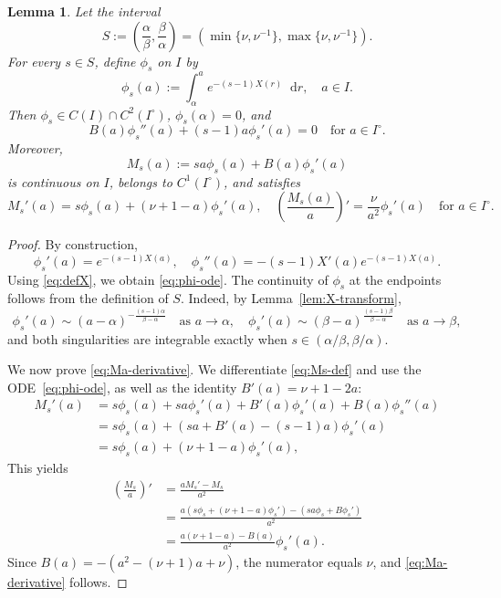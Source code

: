 \documentclass[a4paper,twosided,11pt]{article}
\newcommand{\al}{\alpha}
\newcommand{\be}{\beta}
\newcommand{\1}{\mathbf{1}}
\theoremstyle{plain}
\newtheorem{lemma}[thm]{Lemma}
\theoremstyle{remark}
\newcommand{\diff}{\mathop{} \mathrm{d}}
\numberwithin{equation}{section}
\begin{document}
\begin{lemma}
\label{lem:phi-family}
Let the interval 
\begin{equation*}
 S:=\left(\frac{\al}{\be},\frac{\be}{\al}\right)
 =\left(\min\{\nu,\nu^{-1}\},\max\{\nu,\nu^{-1}\}\right).
\end{equation*}
For every $s\in S$, define $\phi_s$ on $I$ by
\begin{equation*}
 \phi_s(a):=\int_{\al}^{a} e^{-(s-1)X(r)} \diff r,
 \quad a\in I.
\end{equation*}
Then $\phi_s\in C(I)\cap C^2(I^\circ)$, $\phi_s(\al)=0$, and
\begin{equation}
\label{eq:phi-ode}
 B(a)\phi_s''(a)+(s-1)a\phi_s'(a)=0
 \quad \text{for } a\in I^\circ.
\end{equation}
Moreover,
\begin{equation}
\label{eq:Ms-def}
 M_s(a):=s a\phi_s(a)+B(a)\phi_s'(a)
\end{equation}
is continuous on $I$, belongs to $C^1(I^\circ)$, and satisfies
\begin{equation}
\label{eq:Ma-derivative}
M_s'(a)=s\phi_s(a)+(\nu+1-a)\phi_s'(a), \quad \left(\frac{M_s(a)}{a}\right)'=\frac{\nu}{a^2}\phi_s'(a)
 \quad \text{for } a\in I^\circ.
\end{equation}
\end{lemma}



\begin{proof}
By construction,
$$
\phi_s'(a)=e^{-(s-1)X(a)},
\quad
\phi_s''(a)=-(s-1)X'(a)e^{-(s-1)X(a)}.
$$
Using \eqref{eq:defX}, we obtain \eqref{eq:phi-ode}. The continuity of $\phi_s$ at the endpoints follows from the definition of $S$. Indeed, by Lemma~\ref{lem:X-transform},
$$
\phi_s'(a)\sim (a-\al)^{-\frac{(s-1)\al}{\be-\al}}
\quad \text{as } a\to \al,
\quad
\phi_s'(a)\sim (\be-a)^{\frac{(s-1)\be}{\be-\al}}
\quad \text{as } a\to\be,
$$
and both singularities are integrable exactly when $s\in (\al/\be,\be/\al)$.

We now prove \eqref{eq:Ma-derivative}. We differentiate \eqref{eq:Ms-def} and use the ODE~\eqref{eq:phi-ode}, as well as the identity $B'(a)=\nu+1-2a$:
\begin{align*}
 M_s'(a)
 &= s\phi_s(a)+sa\phi_s'(a)+B'(a)\phi_s'(a)+B(a)\phi_s''(a)\\
 &= s\phi_s(a)+\left(sa+B'(a)-(s-1)a\right)\phi_s'(a)\\
 &= s\phi_s(a)+(\nu+1-a)\phi_s'(a),
\end{align*}
This yields
\begin{align*}
\left(\frac{M_s}{a}\right)'
&=\frac{a M_s'-M_s}{a^2}\\
&=\frac{a\left(s\phi_s+(\nu+1-a)\phi_s'\right)-\left(sa\phi_s+B\phi_s'\right)}{a^2}\\
&=\frac{a(\nu+1-a)-B(a)}{a^2} \phi_s'(a).
\end{align*}
Since $B(a)=-(a^2-(\nu+1)a+\nu)$, the numerator equals $\nu$, and \eqref{eq:Ma-derivative} follows.
\end{proof}
\end{document}
